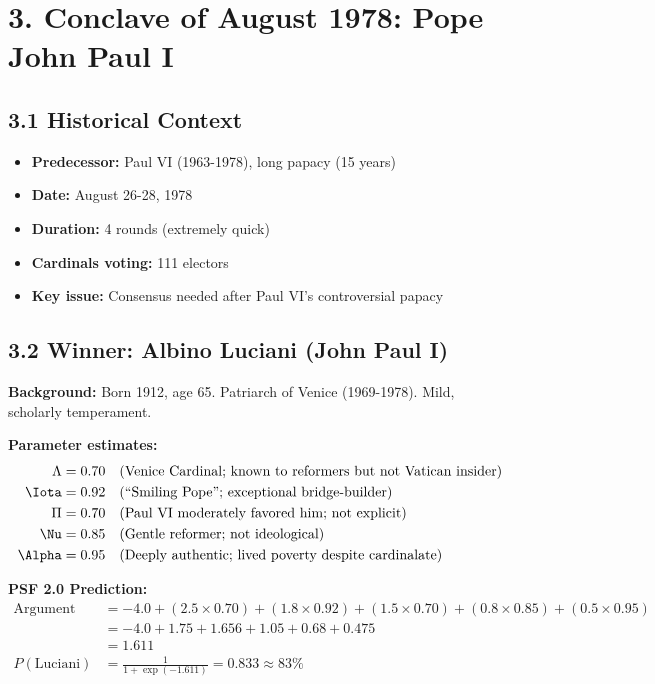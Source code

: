\documentclass[11pt]{article}
\begin{document}
\section{3. Conclave of August 1978: Pope John Paul I}

\subsection{3.1 Historical Context}

\begin{itemize}
\item \textbf{Predecessor:} Paul VI (1963-1978), long papacy (15 years)
\item \textbf{Date:} August 26-28, 1978
\item \textbf{Duration:} 4 rounds (extremely quick)
\item \textbf{Cardinals voting:} 111 electors
\item \textbf{Key issue:} Consensus needed after Paul VI's controversial papacy
\end{itemize}

\subsection{3.2 Winner: Albino Luciani (John Paul I)}

\textbf{Background:} Born 1912, age 65. Patriarch of Venice (1969-1978). Mild, scholarly temperament.

\textbf{Parameter estimates:}
\begin{align*}
\Lambda &= 0.70 \quad \text{(Venice Cardinal; known to reformers but not Vatican insider)} \\
\Iota &= 0.92 \quad \text{(``Smiling Pope''; exceptional bridge-builder)} \\
\Pi &= 0.70 \quad \text{(Paul VI moderately favored him; not explicit)} \\
\Nu &= 0.85 \quad \text{(Gentle reformer; not ideological)} \\
\Alpha &= 0.95 \quad \text{(Deeply authentic; lived poverty despite cardinalate)}
\end{align*}

\textbf{PSF 2.0 Prediction:}
\begin{align*}
\text{Argument} &= -4.0 + (2.5 \times 0.70) + (1.8 \times 0.92) + (1.5 \times 0.70) + (0.8 \times 0.85) + (0.5 \times 0.95) \\
&= -4.0 + 1.75 + 1.656 + 1.05 + 0.68 + 0.475 \\
&= 1.611 \\
P(\text{Luciani}) &= \frac{1}{1 + \exp(-1.611)} = 0.833 \approx 83\%
\end{align*}
\end{document}
